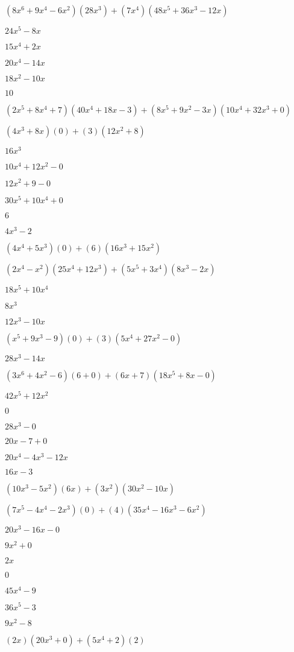 \documentclass{article}
\begin{document}
\begin{multicols}{2}
$(8x^{6}+9x^{4}-6x^2)(28x^{3})+(7x^{4})(48x^{5}+36x^{3}-12x)$\item $24x^{5}-8x$\item $15x^{4}+2x$\item $20x^{4}-14x$\item $18x^{2}-10x$\item $10$\item $(2x^{5}+8x^{4}+7)(40x^{4}+18x-3)+(8x^{5}+9x^2-3x)(10x^{4}+32x^{3}+0)$\item $(4x^{3}+8x)(0)+(3)(12x^{2}+8)$\item $16x^{3}$\item $10x^{4}+12x^{2}-0$\item $12x^{2}+9-0$\item $30x^{5}+10x^{4}+0$\item $6$\item $4x^{3}-2$\item $(4x^{4}+5x^{3})(0)+(6)(16x^{3}+15x^{2})$\item $(2x^{4}-x^2)(25x^{4}+12x^{3})+(5x^{5}+3x^{4})(8x^{3}-2x)$\item $18x^{5}+10x^{4}$\item $8x^{3}$\item $12x^{3}-10x$\item $(x^{5}+9x^{3}-9)(0)+(3)(5x^{4}+27x^{2}-0)$\item $28x^{3}-14x$\item $(3x^{6}+4x^2-6)(6+0)+(6x+7)(18x^{5}+8x-0)$\item $42x^{5}+12x^{2}$\item $0$\item $28x^{3}-0$\item $20x-7+0$\item $20x^{4}-4x^{3}-12x$\item $16x-3$\item $(10x^{3}-5x^2)(6x)+(3x^2)(30x^{2}-10x)$\item $(7x^{5}-4x^{4}-2x^{3})(0)+(4)(35x^{4}-16x^{3}-6x^{2})$\item $20x^{3}-16x-0$\item $9x^{2}+0$\item $2x$\item $0$\item $45x^{4}-9$\item $36x^{5}-3$\item $9x^{2}-8$\item $(2x)(20x^{3}+0)+(5x^{4}+2)(2)$\item 
\end{multicols}
\end{document}
